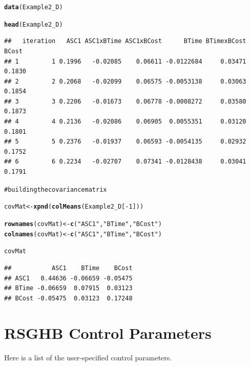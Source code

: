 \documentclass{article}\usepackage{graphicx, color}
\makeatletter
\newcommand{\hlfunctioncall}[1]{\textcolor[rgb]{0.501960784313725,0,0.329411764705882}{\textbf{#1}}}%
\newcommand{\hlstring}[1]{\textcolor[rgb]{0.6,0.6,1}{#1}}%
\newcommand{\hlcomment}[1]{\textcolor[rgb]{0.180392156862745,0.6,0.341176470588235}{#1}}%
\newenvironment{kframe}{%
 \def\at@end@of@kframe{}%
 \ifinner\ifhmode%
  \def\at@end@of@kframe{\end{minipage}}%
  \begin{minipage}{\columnwidth}%
 \fi\fi%
 \def\FrameCommand##1{\hskip\@totalleftmargin \hskip-\fboxsep
 \colorbox{shadecolor}{##1}\hskip-\fboxsep
     \hskip-\linewidth \hskip-\@totalleftmargin \hskip\columnwidth}%
 \MakeFramed {\advance\hsize-\width
   \@totalleftmargin\z@ \linewidth\hsize
   \@setminipage}}%
 {\par\unskip\endMakeFramed%
 \at@end@of@kframe}
\newenvironment{knitrout}{}{} %
\makeatother
\begin{document}
\begin{knitrout}
\color{fgcolor}\begin{kframe}
\begin{alltt}

\hlfunctioncall{data}(Example2_D)

\hlfunctioncall{head}(Example2_D)
\end{alltt}
\begin{verbatim}
##   iteration   ASC1 ASC1xBTime ASC1xBCost      BTime BTimexBCost  BCost
## 1         1 0.1996   -0.02085    0.06611 -0.0122684     0.03471 0.1830
## 2         2 0.2068   -0.02099    0.06575 -0.0053138     0.03063 0.1854
## 3         3 0.2206   -0.01673    0.06778 -0.0008272     0.03580 0.1873
## 4         4 0.2136   -0.02086    0.06905  0.0055351     0.03120 0.1801
## 5         5 0.2376   -0.01937    0.06593 -0.0054135     0.02932 0.1752
## 6         6 0.2234   -0.02707    0.07341 -0.0128438     0.03041 0.1791
\end{verbatim}
\begin{alltt}

\hlcomment{# building the covariance matrix}

covMat <- \hlfunctioncall{xpnd}(\hlfunctioncall{colMeans}(Example2_D[-1]))

\hlfunctioncall{rownames}(covMat) <- \hlfunctioncall{c}(\hlstring{"ASC1"}, \hlstring{"BTime"}, \hlstring{"BCost"})
\hlfunctioncall{colnames}(covMat) <- \hlfunctioncall{c}(\hlstring{"ASC1"}, \hlstring{"BTime"}, \hlstring{"BCost"})

covMat
\end{alltt}
\begin{verbatim}
##           ASC1    BTime    BCost
## ASC1   0.44636 -0.06659 -0.05475
## BTime -0.06659  0.07915  0.03123
## BCost -0.05475  0.03123  0.17248
\end{verbatim}
\end{kframe}
\end{knitrout}


\section*{RSGHB Control Parameters}

Here is a list of the user-specified control parameters.
\end{document}
